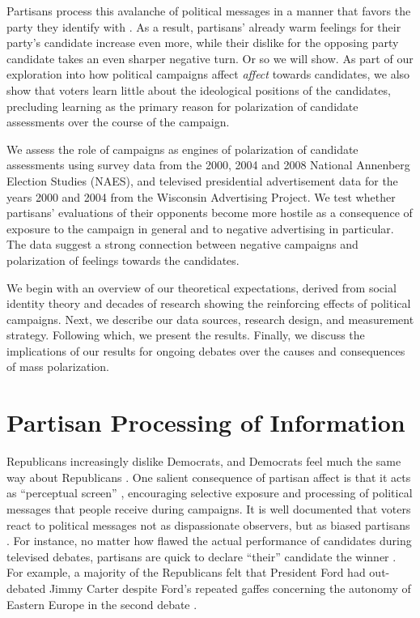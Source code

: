 \documentclass[12pt, letterpaper]{article}
\begin{document}
Partisans process this avalanche of political messages in a manner that favors the party they identify with \citep{chang2003, lodge1986, rahn1993}. As a result, partisans' already warm feelings for their party's candidate increase even more, while their dislike for the opposing party candidate takes an even sharper negative turn. Or so we will show. As part of our exploration into how political campaigns affect \emph{affect} towards candidates, we also show that voters learn little about the ideological positions of the candidates, precluding learning as the primary reason for polarization of candidate assessments over the course of the campaign.

We assess the role of campaigns as engines of polarization of candidate assessments using survey data from the 2000, 2004 and 2008 National Annenberg Election Studies (NAES), and televised presidential advertisement data for the years 2000 and 2004 from the Wisconsin Advertising Project. We test whether partisans' evaluations of their opponents become more hostile as a consequence of exposure to the campaign in general and to negative advertising in particular. The data suggest a strong connection between negative campaigns and polarization of feelings towards the candidates.

We begin with an overview of our theoretical expectations, derived from social identity theory and decades of research showing the reinforcing effects of political campaigns.  Next, we describe our data sources, research design, and measurement strategy. Following which, we present the results. Finally, we discuss the implications of our results for ongoing debates over the causes and consequences of mass polarization.  

\section*{Partisan Processing of Information}
Republicans increasingly dislike Democrats, and Democrats feel much the same way about Republicans \citep{iyengar2012}. One salient consequence of partisan affect is that it acts as ``perceptual screen'' \citep{campbell1960}, encouraging selective exposure and processing of political messages that people receive during campaigns. It is well documented that voters react to political messages not as dispassionate observers, but as biased partisans \citep{chang2003, rahn1993, lodge1986, campbell1960, lord1979}.  For instance, no matter how flawed the actual performance of candidates during televised debates, partisans are quick to declare ``their'' candidate the winner \citep{sigelman1984, iyengar2000b}. For example, a majority of the Republicans felt that President Ford had out-debated Jimmy Carter despite Ford's repeated gaffes concerning the autonomy of Eastern Europe in the second debate \citep{sears1979}.
\end{document}
